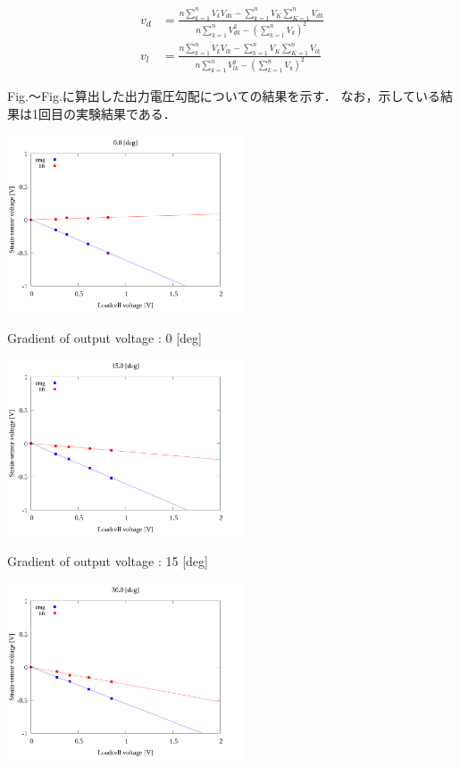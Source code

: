 \begin{eqnarray}
    \displaystyle v_d &= \frac{n\sum^n_{k=1} V_{k} V_{dk} - \sum^n_{k=1} V_{K} \sum^n_{K=1} V_{dk}}{n\sum^n_{k=1}V_{dk}^2 - \left(\sum^n_{k=1}V_k\right)^2}\\
    \displaystyle v_l &= \frac{n\sum^n_{k=1} V_{k} V_{lk} - \sum^n_{k=1} V_{K} \sum^n_{K=1} V_{lk}}{n\sum^n_{k=1}V_{lk}^2 - \left(\sum^n_{k=1}V_k\right)^2}
\end{eqnarray}

Fig.～Fig.に算出した出力電圧勾配についての結果を示す．
なお，示している結果は1回目の実験結果である．

\begin{multicols}{2}
    \begin{figure_here}
        \begin{center}
            \includegraphics[width=70mm]{../../02_workspace/result/2-1/plot/04/04_linear_0.png}
            \caption{Gradient of output voltage : 0 [deg]}
            \includegraphics[width=70mm]{../../02_workspace/result/2-1/plot/04/04_linear_150.png}
            \caption{Gradient of output voltage : 15 [deg]}
            \includegraphics[width=70mm]{../../02_workspace/result/2-1/plot/04/04_linear_300.png}

\end{center}
\end{figure_here}
\end{multicols}
